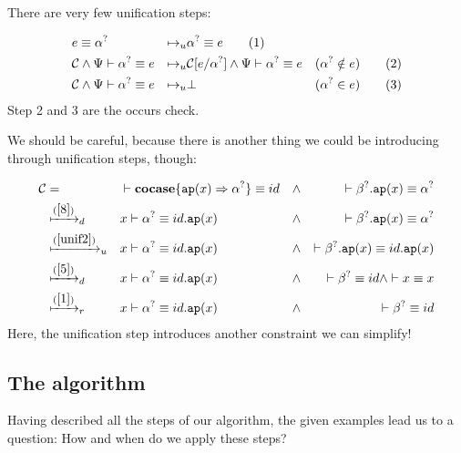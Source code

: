 \documentclass[twoside,12pt,a4paper]{article}
\begin{document}
There are very few unification steps: 
\begin{definition}[Unification]
    \begin{align*}
        & e \equiv\alpha^?
        &\mapsto_u& \alpha^? \equiv e 
        \tag{1}\\
        &\mathcal{C} \wedge \Psi \vdash \alpha^? \equiv e 
        &\mapsto_u& \mathcal{C}[e/\alpha^?] \wedge \Psi \vdash \alpha^? \equiv e &(\alpha^? \notin e)
        \tag{2}\label{unif2}\\
        &\mathcal{C} \wedge \Psi \vdash \alpha^? \equiv e
        &\mapsto_u& \bot &(\alpha^?\in e)
        \tag{3}
    \end{align*}
Step 2 and 3 are the occurs check.
\end{definition}

We should be careful, because there is another thing we could be introducing through unification steps, though:
\begin{example}
    \begin{align*}
        \mathcal{C} &=& &\vdash \textbf{cocase}\{\texttt{ap}(x)\Rightarrow\alpha^?\}\equiv id 
        &\wedge& &\vdash \beta^?.\texttt{ap}(x)\equiv \alpha^?\\
        &\xmapsto{(\ref{8})}_d& &x \vdash \alpha^? \equiv id.\texttt{ap}(x)
        &\wedge& &\vdash \beta^?.\texttt{ap}(x)\equiv \alpha^?\\
        &\xmapsto{(\ref{unif2})}_u& &x \vdash \alpha^? \equiv id.\texttt{ap}(x)
        &\wedge& &\vdash \beta^?.\texttt{ap}(x)\equiv id.\texttt{ap}(x)\\
        &\xmapsto{(\ref{5})}_d& &x \vdash \alpha^? \equiv id.\texttt{ap}(x) 
        &\wedge& &\vdash \beta^? \equiv id \wedge \vdash x \equiv x\\
        &\xmapsto{(\ref{1})}_r& &x \vdash \alpha^? \equiv id.\texttt{ap}(x)
        &\wedge& &\vdash \beta^? \equiv id
    \end{align*}
    Here, the unification step introduces another constraint we can simplify! 
\end{example}

\subsection{The algorithm}
Having described all the steps of our algorithm, the given examples lead us to a question:
How and when do we apply these steps?
\end{document}
